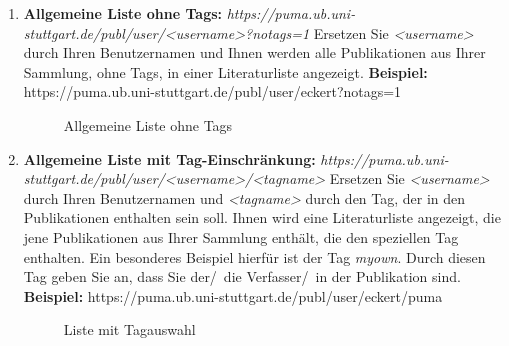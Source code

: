 \begin{description}
\begin{enumerate}
    \item \textbf{Allgemeine Liste ohne Tags:}\newline
    \textit{https://puma.ub.uni-stuttgart.de/publ/user/<username>?notags=1}\newline
    Ersetzen Sie \textit{<username>} durch Ihren Benutzernamen und Ihnen werden alle Publikationen aus Ihrer Sammlung, ohne Tags, in einer Literaturliste angezeigt.\newline
    \textbf{Beispiel:} https://puma.ub.uni-stuttgart.de/publ/user/eckert?notags=1 
    
\begin{figure}[h!]
 \centering
 \caption{Allgemeine Liste ohne Tags}
 \label{figure036}
\end{figure}

    \item \textbf{Allgemeine Liste mit Tag-Einschränkung:}\newline
    \textit{https://puma.ub.uni-stuttgart.de/publ/user/<username>/<tagname>}\newline
    Ersetzen Sie \textit{<username>} durch Ihren Benutzernamen und \textit{<tagname>} durch den Tag, der in den Publikationen enthalten sein soll. Ihnen wird eine Literaturliste angezeigt, die jene Publikationen aus Ihrer Sammlung enthält, die den speziellen Tag enthalten. Ein besonderes Beispiel hierfür ist der Tag \textit{myown}. Durch diesen Tag geben Sie an, dass Sie der/~die Verfasser/~in der Publikation sind. \newline
    \textbf{Beispiel:} https://puma.ub.uni-stuttgart.de/publ/user/eckert/puma
   
\begin{figure}[h!]
 \centering
 \caption{Liste mit Tagauswahl}
 \label{figure037}
\end{figure}


\end{enumerate}
\end{description}
